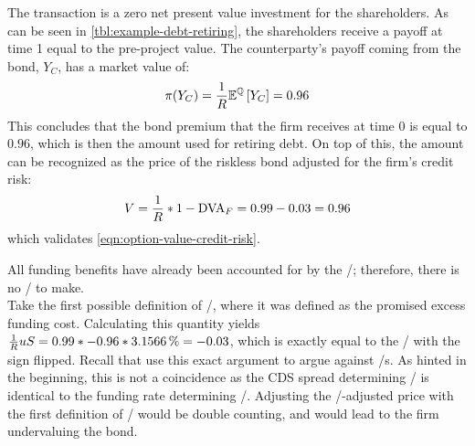 \documentclass[../main.tex]{subfiles}
\begin{document}
            The transaction is a zero net present value investment for the shareholders. 
            As can be seen in \cref{tbl:example-debt-retiring}, 
            the shareholders receive a payoff at time 1 equal to the pre-project value.
            The counterparty's payoff coming from the bond, $Y_C$, has a market value of:
            \begin{equation*}
                \pi(Y_{C}) = \frac{1}{R} \mathbb{E}^{\mathbb{Q}}\left[Y_{C}\right] = \num{0.96}
            \end{equation*}
            This concludes that the bond premium that the firm receives at time 0 is equal to $\num{0.96}$, 
            which is then the amount used for retiring debt. 
            On top of this, the amount can be recognized 
            as the price of the riskless bond adjusted for the firm's credit risk:
            \begin{equation*}
                V = \discountfactor * 1 - \DVA/_F = \num{0.99} - \num{0.03} = \num{0.96}
            \end{equation*}
            which validates \cref{eqn:option-value-credit-risk}. 

            All funding benefits have already been accounted for by the \DVA/;
            therefore, there is no \FVA/ to make.
            \\
            Take the first possible definition of \FVA/, 
            where it was defined as the promised excess funding cost.
            Calculating this quantity yields 
            $\discountfactor u S = \num{0.99} * \num{-0.96} * \pct{0.031566} = \num{-0.03}$,
            which is exactly equal to the \DVA/ with the sign flipped.
            Recall that \textcite{HullWhite2012FVA} use this exact argument to argue against \FVA/s.
            As hinted in the beginning, 
            this is not a coincidence as the CDS spread determining \DVA/
            is identical to the funding rate determining \FVA/.
            Adjusting the \DVA/-adjusted price with the first definition of \FVA/ would be double counting,
            and would lead to the firm undervaluing the bond.
            
\end{document}

